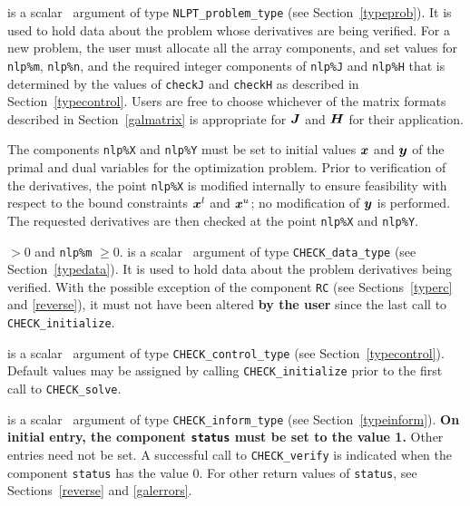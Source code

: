 \documentclass{galahad}
\newcommand{\packagename}{CHECK}
\begin{document}
\vspace*{-2mm}
\begin{description}
 is a scalar \intentinout\ argument of type 
{\tt NLPT\_problem\_type}
(see Section~\ref{typeprob}). 
It is used to hold data about the problem whose derivatives are being verified.
For a new problem, the user must allocate all the array components,
and set values for {\tt nlp\%m}, {\tt nlp\%n},
and the required integer components of {\tt nlp\%J} and {\tt nlp\%H}
that is determined by the values of {\tt checkJ} and {\tt checkH} as described in Section~\ref{typecontrol}.  
Users are free to choose whichever
of the matrix formats described in Section~\ref{galmatrix} 
is appropriate for ${\bm{J}}$ and ${\bm{H}}$ for their application.

\noindent
The components {\tt nlp\%X} and {\tt nlp\%Y} must be set to initial
values ${\bm{x}}$ and ${\bm{y}}$ of the primal and dual variables for the
optimization problem.  Prior to verification of the derivatives, the point {\tt nlp\%X} is modified
internally to ensure feasibility with respect to the bound constraints
${\bm{x}}^l$ and ${\bm{x}}^u$; no modification of ${\bm{y}}$ is performed.  The
requested derivatives are then checked at the point {\tt nlp\%X} and {\tt nlp\%Y}.

\noindent
{} $> 0$ and {\tt nlp\%m} $\geq 0$.
 is a scalar \intentinout\ argument of type 
{\tt \packagename\_data\_type}
(see Section~\ref{typedata}). It is used to hold data about the
problem derivatives being verified.  With the possible exception of the component 
{\tt RC} (see Sections~\ref{typerc} and \ref{reverse}), 
it must not have been altered {\bf by the user} since the last call to 
{\tt \packagename\_initialize}.

 is a scalar \intentin\ argument of type 
{\tt \packagename\_control\_type}
(see Section~\ref{typecontrol}). Default values may be assigned by calling 
{\tt \packagename\_initialize} prior to the first call to 
{\tt \packagename\_solve}.

 is a scalar \intentinout\ argument of type 
{\tt \packagename\_inform\_type}
(see Section~\ref{typeinform}). 
{\bf On initial entry, the  component {\tt status} must be set to the value 1.} 
Other entries need not be set.
A successful call to
{\tt \packagename\_verify}
is indicated when the  component {\tt status} has the value 0. 
For other return values of {\tt status}, see Sections~\ref{reverse} and
\ref{galerrors}.


\end{description}
\end{document}
